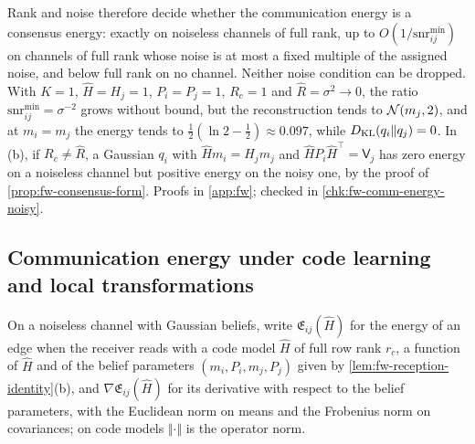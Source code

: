 Rank and noise therefore decide whether the communication energy is a consensus energy: exactly on noiseless channels of full rank, up to $O(1/\mathrm{snr}^{\min}_{ij})$ on channels of full rank whose noise is at most a fixed multiple of the assigned noise, and below full rank on no channel. Neither noise condition can be dropped. With $K=1$, $\hat H=H_j=1$, $P_i=P_j=1$, $R_c=1$ and $\hat R=\sigma^2\to0$, the ratio $\mathrm{snr}^{\min}_{ij}=\sigma^{-2}$ grows without bound, but the reconstruction tends to $\mathcal{N}(m_j,2)$, and at $m_i=m_j$ the energy tends to $\tfrac12(\ln2-\tfrac12)\approx0.097$, while $D_{\mathrm{KL}}(q_i\Vert q_j)=0$. In (b), if $R_c\ne\hat R$, a Gaussian $q_i$ with $\hat Hm_i=H_jm_j$ and $\hat HP_i\hat H^\top=\mathsf V_j$ has zero energy on a noiseless channel but positive energy on the noisy one, by the proof of \cref{prop:fw-consensus-form}. Proofs in \cref{app:fw}; checked in \cref{chk:fw-comm-energy-noisy}.

\subsection{Communication energy under code learning and local transformations}\label{sup:fw-comm-energy-learning}

On a noiseless channel with Gaussian beliefs, write $\mathfrak E_{ij}(\hat H)$ for the energy of an edge when the receiver reads with a code model $\hat H$ of full row rank $r_c$, a function of $\hat H$ and of the belief parameters $(m_i,P_i,m_j,P_j)$ given by \cref{lem:fw-reception-identity}(b), and $\nabla\mathfrak E_{ij}(\hat H)$ for its derivative with respect to the belief parameters, with the Euclidean norm on means and the Frobenius norm on covariances; on code models $\Vert\cdot\Vert$ is the operator norm.

